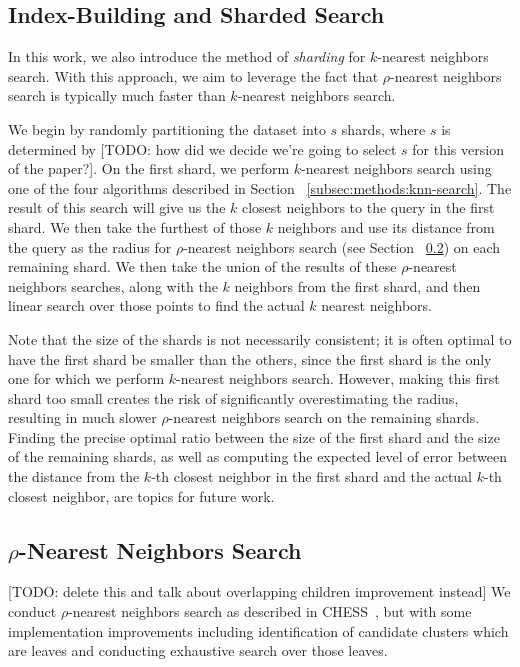 \subsection {Index-Building and Sharded Search}
In this work, we also introduce the method of \emph{sharding} for $k$-nearest neighbors search.
With this approach, we aim to leverage the fact that $\rho$-nearest neighbors search is typically 
much faster than $k$-nearest neighbors search. 


We begin by randomly partitioning the dataset into $s$ shards, where $s$ is determined by [TODO: how did 
we decide we're going to select $s$ for this version of the paper?]. On the first shard, we perform 
$k$-nearest neighbors search using one of the four algorithms described in Section ~\ref{subsec:methods:knn-search}.
The result of this search will give us the $k$ closest neighbors to the query in the first shard. We then take the furthest of 
those $k$ neighbors and use its distance from the query as the radius for $\rho$-nearest neighbors search (see Section ~\ref{subsec:methods:rnn-search}) 
on each remaining shard. We then take the union of the results of these $\rho$-nearest neighbors searches, along with the $k$ neighbors
from the first shard, and then linear search over those points to find the actual $k$ nearest neighbors.


Note that the size of the shards is not necessarily consistent; it is often optimal to have the first shard be smaller than the others,
since the first shard is the only one for which we perform $k$-nearest neighbors search. However, making this first shard too small
creates the risk of significantly overestimating the radius, resulting in much slower $\rho$-nearest neighbors search on the remaining shards.
Finding the precise optimal ratio between the size of the first shard and the size of the remaining shards, as well 
as computing the expected level of error between the distance from the $k$-th closest neighbor in the first shard and the 
actual $k$-th closest neighbor, are topics for future work.

\subsection{\texorpdfstring{$\rho$}{p}-Nearest Neighbors Search}
\label{subsec:methods:rnn-search}

[TODO: delete this and talk about overlapping children improvement instead]
We conduct $\rho$-nearest neighbors search as described in CHESS~\cite{ishaq2019clustered}, but 
with some implementation improvements including identification of candidate clusters which are leaves and 
conducting exhaustive search over those leaves.

